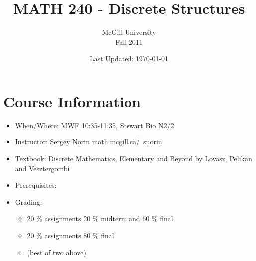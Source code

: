 \documentclass[9pt, letterpaper, oneside]{article}
\title{MATH 240 - Discrete Structures}
\author{McGill University \\ Fall 2011}
\date{Last Updated: \today}
\begin{document}

\maketitle
\tableofcontents
{}


\section*{Course Information}

\begin{itemize}
\item When/Where: MWF 10:35-11:35, Stewart Bio N2/2
\item Instructor: Sergey Norin math.mcgill.ca/~snorin
\item Textbook: Discrete Mathematics, Elementary and Beyond by Lovasz, Pelikan and Vesztergombi
\item Prerequisites: 
\item Grading:
	\begin{itemize}
		\item 20 \% assignments 20 \% midterm and 60 \% final
		\item 20 \% assignments 80 \% final
		\item (best of two above)
	\end{itemize}
\end{itemize}
\end{document}
